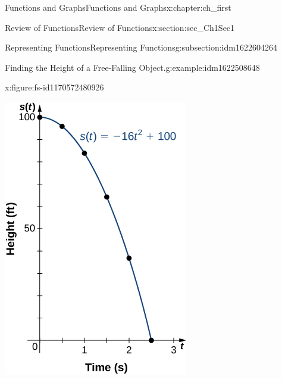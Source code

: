 \documentclass[oneside,10pt,]{book}
\numberwithin{equation}{section}
\begin{document}
\begin{chapterptx}{Functions and Graphs}{}{Functions and Graphs}{}{}{x:chapter:ch_first}
\begin{sectionptx}{Review of Functions}{}{Review of Functions}{}{}{x:section:sec_Ch1Sec1}
\begin{subsectionptx}{Representing Functions}{}{Representing Functions}{}{}{g:subsection:idm1622604264}
\begin{example}{Finding the Height of a Free-Falling Object.}{g:example:idm1622508648}
\begin{enumerate}
\begin{figureptx}{}{x:figure:fs-id1170572480926}{}
\begin{image}{0.25}{0.5}{0.25}
\includegraphics[width=\linewidth]{external/CNX_Calc_Figure_01_01_009.jpg}
\end{image}%
\tcblower
\end{figureptx}%
%
\end{enumerate}
\end{example}

\end{subsectionptx}
\end{sectionptx}
\end{chapterptx}
\end{document}
